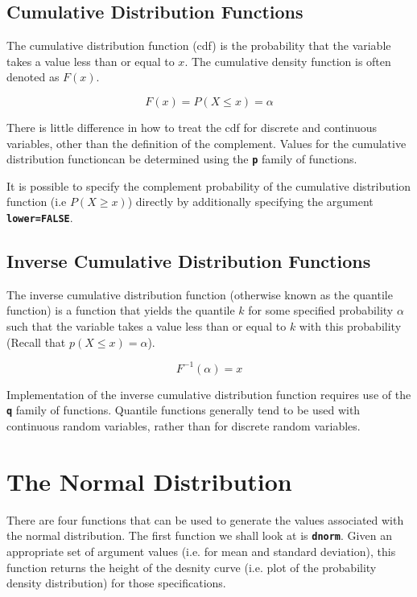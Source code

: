 \documentclass[a4paper,12pt]{article}
\begin{document}
\subsection{Cumulative Distribution Functions}

The cumulative distribution function (cdf) is the probability that the variable takes a value less than or equal to $x$. The cumulative density function is often denoted as $F(x)$.
 
 \[F(x)= P(X \leq x) = \alpha \]

There is little difference in how to treat the cdf for discrete and continuous variables, other than the definition of the complement.
Values for the cumulative distribution functioncan be determined using the \texttt{\textbf{p}} family of functions. 

It is possible to specify the complement probability of the cumulative distribution function (i.e $P(X \geq x)$) directly by additionally specifying the argument \texttt{\textbf{lower=FALSE}}.
 
\subsection{Inverse Cumulative Distribution Functions}

The inverse cumulative distribution function (otherwise known as the quantile function) is a function that yields the quantile $k$ for some specified probability $\alpha$ such that the variable takes a value less than or equal to $k$ with this probability (Recall that $p(X \leq x) = \alpha $).

\[F^{-1}(\alpha) = x  \]

Implementation of the inverse cumulative distribution function requires use of the \texttt{\textbf{q}} family of functions. Quantile functions generally tend to be used with continuous random variables, rather than for discrete random variables.

\section{The Normal Distribution}

There are four functions that can be used to generate the values associated with the normal distribution.  
The first function we shall look at is \textbf{\texttt{dnorm}}. Given an appropriate set of argument values (i.e. for mean and standard deviation), this function returns the height of the desnity curve (i.e. plot of the probability density distribution) for those specifications. 
\end{document}
